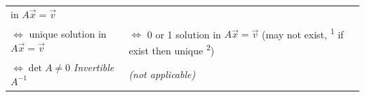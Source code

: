 \documentclass[12pt]{article}
\newcommand{\myvec}[1]{\vec{#1}}
\begin{document}
\begin{tabularx}{\textwidth}{XXc}
            \phantom{$\iff$} in $A\myvec{x} = \myvec{v}$
        &
    \\ \arrayrulecolor{black!70} \cline{1-2} \arrayrulecolor{black}
        $\iff$ unique solution \newline
            \phantom{$\iff$} in $A\myvec{x} = \myvec{v}$ 
        & $\iff$ 0 or 1 solution \newline
            \phantom{$\iff$} in $A\myvec{x} = \myvec{v}$ \newline 
            \phantom{$\iff$} (may not exist, \textsuperscript{1} \newline
            \phantom{$\iff$(} if exist then unique \textsuperscript{2}) 
        & 
    \\ \arrayrulecolor{black!30} \cline{1-2} \arrayrulecolor{black}
        $\iff \det A \neq 0$ \newline 
            \phantom{$\iff$} \emph{Invertible} \newline 
            \phantom{$\iff$} $A^{-1}$
        & \emph{(not applicable)} 
        & 
    \\ \hline
\end{tabularx}


\vfill
\end{document}
